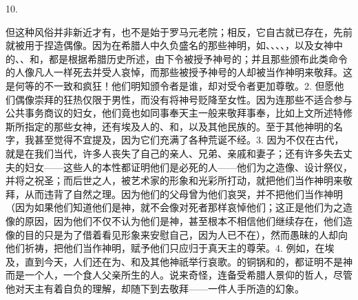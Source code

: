 10. \par

但这种风俗并非新近才有，也不是始于罗马元老院；相反，它自古就已存在，先前就被用于捏造偶像。因为在希腊人中久负盛名的那些神明，如、、、、，以及女神中的、、和，都是根据希腊历史所述，由下令被授予神号的；并且那些颁布此类命令的人像凡人一样死去并受人哀悼，而那些被授予神号的人却被当作神明来敬拜。这是何等的不一致和疯狂！他们明知颁令者是谁，却对受令者更加尊敬。2. 但愿他们偶像崇拜的狂热仅限于男性，而没有将神号贬降至女性。因为连那些不适合参与公共事务商议的妇女，他们竟也如同事奉天主一般来敬拜事奉，比如上文所述特修斯所指定的那些女神，还有埃及人的、和，以及其他民族的。至于其他神明的名字，我甚至觉得不宜提及，因为它们充满了各种荒诞不经。3. 因为不仅在古代，就是在我们当代，许多人丧失了自己的亲人、兄弟、亲戚和妻子；还有许多失去丈夫的妇女——这些人的本性都证明他们是必死的人——他们为之造像、设计祭仪，并将之祝圣；而后世之人，被艺术家的形象和光彩所打动，就把他们当作神明来敬拜，从而违背了自然之理。因为他们的父母曾为他们哀哭，并不把他们当作神明（因为如果他们知道他们是神，就不会像对死者那样哀悼他们；这正是他们为之造像的原因，因为他们不仅不认为他们是神，甚至根本不相信他们继续存在，他们造像的目的只是为了借着看见形象来安慰自己，因为人已不在），然而愚昧的人却向他们祈祷，把他们当作神明，赋予他们只应归于真天主的尊荣。4. 例如，在埃及，直到今天，人们还在为、和及其他神祇举行哀歌。的铜锅和的，都证明不是神而是一个人，一个食人父亲所生的人。说来奇怪，连备受希腊人景仰的哲人，尽管他对天主有着自负的理解，却随下到去敬拜——一件人手所造的幻象。\par

\par

